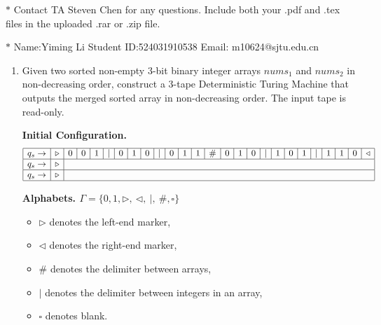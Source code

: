 \documentclass[12pt,a4paper]{article}
\theoremstyle{definition}
\begin{document}
\noindent

\noindent{}
\begin{center}
\footnotesize{\color{red}$*$ Contact TA Steven Chen for any questions. Include both your .pdf and .tex files in the uploaded .rar or .zip file.}

\footnotesize{\color{blue}$*$ Name:Yiming Li  \quad Student ID:524031910538 \quad Email: m10624@sjtu.edu.cn}
\end{center}


\begin{enumerate}
    \item {\color{purple}{(Turing Machine)}} 
    
    Given two sorted non-empty 3-bit binary integer arrays \(nums_1\) and \(nums_2\) in non-decreasing order, construct a 3-tape Deterministic Turing Machine that outputs the merged sorted array in non-decreasing order. The input tape is read-only.
    
    \textbf{Initial Configuration.}
    \[
        \begin{array}{|*{26}{c|}}
        \hline
        q_s \rightarrow & \triangleright & 0 & 0 & 1 & | & 0 & 1 & 0 & | & 0 & 1 & 1 & \# & 0 & 1 & 0 & | & 1 & 0 & 1 & | & 1 & 1 & 0 & \triangleleft \\
        \hline
        q_s \rightarrow & \triangleright & \multicolumn{24}{c|}{} \\
        \hline
        q_s \rightarrow & \triangleright & \multicolumn{24}{c|}{} \\
        \hline
        
        \end{array}
    \]
    

    \textbf{Alphabets. $\Gamma = \{0,1,\triangleright,\ \triangleleft,\ \vert,\ \#, \square\}$}

    \begin{itemize}
        \item \(\triangleright\) denotes the left-end marker,
        \item \(\triangleleft\) denotes the right-end marker,
        \item \(\#\) denotes the delimiter between arrays,
        \item \(\vert\) denotes the delimiter between integers in an array,
        \item \(\square\) denotes blank.
    \end{itemize}


\end{enumerate}
\end{document}
